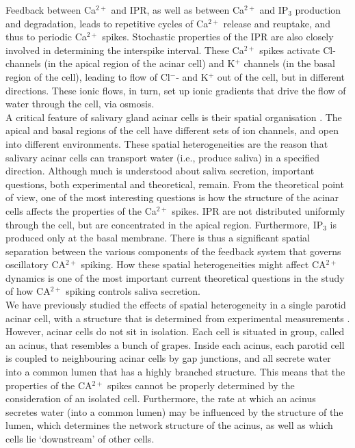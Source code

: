\documentclass[a4paper,10pt]{article}
\begin{document}
Feedback between Ca$^{2+}$ and IPR, as well as between Ca$^{2+}$ and IP$_3$ production and degradation, leads to repetitive cycles of Ca$^{2+}$ release and reuptake, and thus to periodic Ca$^{2+}$ spikes. Stochastic properties of the IPR are also closely involved in determining the interspike interval.
These Ca$^{2+}$ spikes activate Cl- channels (in the apical region of the acinar cell) and K$^+$ channels (in the basal region of the cell), leading to flow of Cl$^{-}$- and K$^{+}$ out of the cell, but in different directions. These ionic flows, in turn, set up ionic gradients that drive the flow of water through the cell, via osmosis.\\

A critical feature of salivary gland acinar cells is their spatial organisation \cite{Sneyd2017383}. The apical and basal regions of the cell have different sets of ion channels, and open into different environments. These spatial heterogeneities are the reason that salivary acinar cells can transport water (i.e., produce saliva) in a specified direction.
Although much is understood about saliva secretion, important questions, both experimental and theoretical, remain. From the theoretical point of view, one of the most interesting questions is how the structure of the acinar cells affects the properties of the Ca$^{2+}$ spikes. IPR are not distributed uniformly through the cell, but are concentrated in the apical region. Furthermore, IP$_3$ is produced only at the basal membrane. There is thus a significant spatial separation between the various components of the feedback system that governs oscillatory CA$^{2+}$ spiking. How these spatial heterogeneities might affect CA$^{2+}$ dynamics is one of the most important current theoretical questions in the study of how CA$^{2+}$ spiking controls saliva secretion.\\

We have previously studied the effects of spatial heterogeneity in a single parotid acinar cell, with a structure that is determined from experimental measurements \cite{sneyd2003}. However, acinar cells do not sit in isolation. Each cell is situated in group, called an acinus, that resembles a bunch of grapes. Inside each acinus, each parotid cell is coupled to neighbouring acinar cells by gap junctions, and all secrete water into a common lumen that has a highly branched structure. This means that the properties of the CA$^{2+}$ spikes cannot be properly determined by the consideration of an isolated cell. Furthermore, the rate at which an acinus secretes water (into a common lumen) may be influenced by the structure of the lumen, which determines the network structure of the acinus, as well as which cells lie `downstream' of other cells.\\
\end{document}
